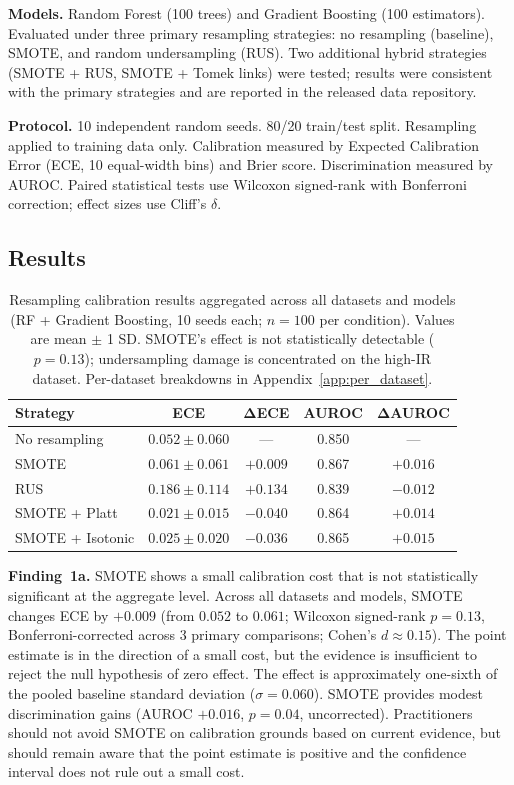 \documentclass[11pt]{article}
\begin{document}
\textbf{Models.} Random Forest (100 trees) and Gradient Boosting (100 estimators). Evaluated under three primary resampling strategies: no resampling (baseline), SMOTE, and random undersampling (RUS). Two additional hybrid strategies (SMOTE + RUS, SMOTE + Tomek links) were tested; results were consistent with the primary strategies and are reported in the released data repository.

\textbf{Protocol.} 10 independent random seeds. 80/20 train/test split. Resampling applied to training data only. Calibration measured by Expected Calibration Error (ECE, 10 equal-width bins) and Brier score. Discrimination measured by AUROC. Paired statistical tests use Wilcoxon signed-rank with Bonferroni correction; effect sizes use Cliff's $\delta$.

\subsection{Results}

\begin{table}[t]
\centering
\caption{Resampling calibration results aggregated across all datasets and models (RF + Gradient Boosting, 10 seeds each; $n=100$ per condition). Values are mean $\pm$ 1 SD. SMOTE's effect is not statistically detectable ($p=0.13$); undersampling damage is concentrated on the high-IR dataset. Per-dataset breakdowns in Appendix~\ref{app:per_dataset}.}
\label{tab:resampling_agg}
\begin{tabular}{@{}lcccc@{}}
\toprule
\textbf{Strategy} & \textbf{ECE} & $\boldsymbol{\Delta}$\textbf{ECE} & \textbf{AUROC} & $\boldsymbol{\Delta}$\textbf{AUROC} \\
\midrule
No resampling  & $0.052 \pm 0.060$ & ---      & 0.850 & --- \\
SMOTE          & $0.061 \pm 0.061$ & $+0.009$ & 0.867 & $+0.016$ \\
RUS            & $0.186 \pm 0.114$ & $+0.134$ & 0.839 & $-0.012$ \\
SMOTE + Platt  & $0.021 \pm 0.015$ & $-0.040$ & 0.864 & $+0.014$ \\
SMOTE + Isotonic & $0.025 \pm 0.020$ & $-0.036$ & 0.865 & $+0.015$ \\
\bottomrule
\end{tabular}
\end{table}

\textbf{Finding~1a.} SMOTE shows a small calibration cost that is not statistically significant at the aggregate level. Across all datasets and models, SMOTE changes ECE by $+0.009$ (from $0.052$ to $0.061$; Wilcoxon signed-rank $p = 0.13$, Bonferroni-corrected across 3 primary comparisons; Cohen's $d \approx 0.15$). The point estimate is in the direction of a small cost, but the evidence is insufficient to reject the null hypothesis of zero effect. The effect is approximately one-sixth of the pooled baseline standard deviation ($\sigma = 0.060$). SMOTE provides modest discrimination gains (AUROC $+0.016$, $p = 0.04$, uncorrected). Practitioners should not avoid SMOTE on calibration grounds based on current evidence, but should remain aware that the point estimate is positive and the confidence interval does not rule out a small cost.
\end{document}
